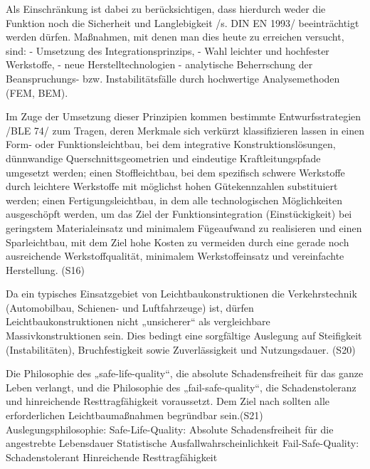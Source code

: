 Als Einschränkung ist dabei zu berücksichtigen, dass hierdurch weder die Funktion noch die Sicherheit und Langlebigkeit /s. DIN EN 1993/ beeinträchtigt werden dürfen. Maßnahmen, mit denen man dies heute zu erreichen versucht, sind:
- Umsetzung des Integrationsprinzips,
- Wahl leichter und hochfester Werkstoffe,
- neue Herstelltechnologien
- analytische Beherrschung der Beanspruchungs- bzw. Instabilitätsfälle durch hochwertige Analysemethoden (FEM, BEM).

Im Zuge der Umsetzung dieser Prinzipien kommen bestimmte Entwurfsstrategien /BLE 74/ zum Tragen, deren Merkmale sich verkürzt klassifizieren lassen in
  einen Form- oder Funktionsleichtbau, bei dem integrative Konstruktionslösungen, dünnwandige Querschnittsgeometrien und eindeutige Kraftleitungspfade umgesetzt werden;
  einen Stoffleichtbau, bei dem spezifisch schwere Werkstoffe durch leichtere Werkstoffe mit möglichst hohen Gütekennzahlen substituiert werden;
  einen Fertigungsleichtbau, in dem alle technologischen Möglichkeiten ausgeschöpft werden, um das Ziel der Funktionsintegration (Einstückigkeit) bei geringstem Materialeinsatz und minimalem Fügeaufwand zu realisieren
und
  einen Sparleichtbau, mit dem Ziel hohe Kosten zu vermeiden durch eine gerade noch ausreichende Werkstoffqualität, minimalem Werkstoffeinsatz und vereinfachte Herstellung.
(S16)

Da ein typisches Einsatzgebiet von Leichtbaukonstruktionen die Verkehrstechnik (Automobilbau, Schienen- und Luftfahrzeuge) ist, dürfen Leichtbaukonstruktionen nicht „unsicherer“ als vergleichbare Massivkonstruktionen sein. Dies bedingt eine sorgfältige Auslegung auf Steifigkeit (Instabilitäten), Bruchfestigkeit sowie Zuverlässigkeit und Nutzungsdauer. (S20)

Die Philosophie des „safe-life-quality“, die absolute Schadensfreiheit für das ganze Leben verlangt, und die Philosophie des „fail-safe-quality“, die Schadenstoleranz und hinreichende Resttragfähigkeit voraussetzt. Dem Ziel nach sollten alle erforderlichen Leichtbaumaßnahmen begründbar sein.(S21)
Auslegungsphilosophie:
  Safe-Life-Quality:
    Absolute Schadensfreiheit für die angestrebte Lebensdauer
    Statistische Ausfallwahrscheinlichkeit
  Fail-Safe-Quality:
    Schadenstolerant
    Hinreichende Resttragfähigkeit

